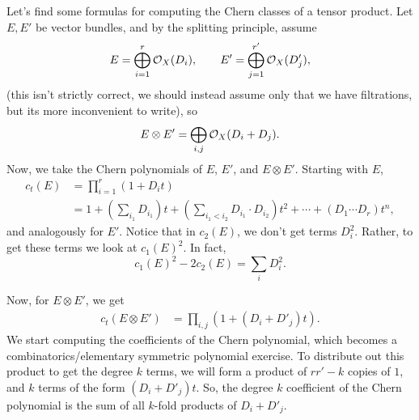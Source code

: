 \documentclass[12pt]{article}
\begin{document}
\begin{eg}
    Let's find some formulas for computing the Chern classes of a tensor product. Let $E,E'$ be vector bundles, and by the splitting principle, assume
    \[E = \bigoplus_{i=1}^r \mathcal{O}_X(D_i), \qquad E' = \bigoplus_{j=1}^{r'} \mathcal{O}_X(D_j'),\]
    (this isn't strictly correct, we should instead assume only that we have filtrations, but its more inconvenient to write), so
    \[E\otimes E' = \bigoplus_{i,j} \mathcal{O}_X(D_i + D_j).\]
    Now, we take the Chern polynomials of $E$, $E'$, and $E\otimes E'$. Starting with $E$,
    \begin{align*}
        c_t(E) &= \prod_{i=1}^r (1+D_i t)\\
        &= 1 + \left(\sum_{i_1} D_{i_1}\right) t + \left(\sum_{i_1<i_2} D_{i_1}\cdot D_{i_2}\right)t^2 + \cdots + (D_1\cdots D_r) t^n,
    \end{align*}
    and analogously for $E'$. Notice that in $c_2(E)$, we don't get terms $D_i^2$. Rather, to get these terms we look at $c_1(E)^2$. In fact,
    \[c_1(E)^2 - 2c_2(E) = \sum_i D_i^2.\]
    
    Now, for $E\otimes E'$, we get
    \begin{align*}
        c_t(E\otimes E') &= \prod_{i,j} (1+(D_i + D'_j)t).
    \end{align*}
    We start computing the coefficients of the Chern polynomial, which becomes a combinatorics/elementary symmetric polynomial exercise. To distribute out this product to get the degree $k$ terms, we will form a product of $rr'-k$ copies of $1$, and $k$ terms of the form $(D_i+D'_j)t$. So, the degree $k$ coefficient of the Chern polynomial is the sum of all $k$-fold products of $D_i + D'_j$.
    

\end{eg}
\end{document}
